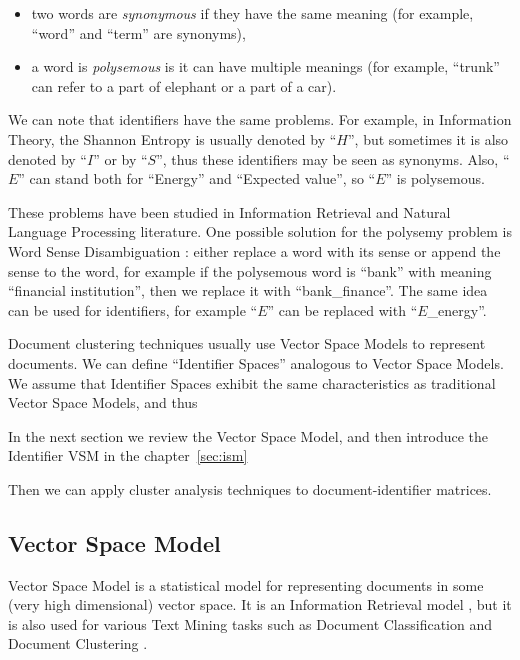\begin{itemize}
\itemsep1pt\parskip0pt
  \item two words are \emph{synonymous} if they have the same meaning
        (for example, ``word'' and ``term'' are synonyms),
  \item a word is \emph{polysemous} is it can have multiple meanings
        (for example, ``trunk'' can refer to a part of elephant or a part of a car).
\end{itemize}


We can note that identifiers have the same problems. For example,
in Information Theory, the Shannon Entropy is usually denoted by
``$H$'', but sometimes it is also denoted by ``$I$'' or by ``$S$'',
thus these identifiers may be seen as synonyms.
Also, ``$E$'' can stand both for ``Energy'' and ``Expected value'',
so ``$E$'' is polysemous.

These problems have been studied in Information Retrieval and
Natural Language Processing literature.
One possible solution for the polysemy problem is Word Sense Disambiguation
\cite{jurafsky2000speech}: either replace a word with its sense
\cite{stokoe2003word} or append the sense to the word, for example
if the polysemous word is ``bank'' with meaning ``financial institution'',
then we replace it with ``bank\_finance''. The same idea can be used
for identifiers, for example ``$E$'' can be replaced with ``$E$\_energy''.

Document clustering techniques usually use Vector Space Models
\cite{oikonomakou2005review} \cite{aggarwal2012survey} to represent documents.
We can define ``Identifier Spaces'' analogous to Vector Space Models.
We assume that Identifier Spaces exhibit the same characteristics as
traditional Vector Space Models, and thus

In the next section we review the Vector Space Model,
and then introduce the Identifier VSM in the chapter~\ref{sec:ism}

Then we can apply cluster analysis techniques to document-identifier matrices.


\subsection{Vector Space Model} \label{sec:vsm}

Vector Space Model is a statistical model for representing documents
in some (very high dimensional) vector space. It is an Information Retrieval
model \cite{manning2008introduction}, but it is also used for various
Text Mining tasks such as Document Classification \cite{sebastiani2002machine}
and Document Clustering \cite{oikonomakou2005review} \cite{aggarwal2012survey}.

